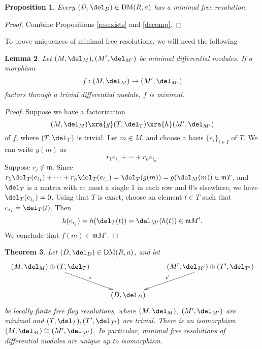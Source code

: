 \documentclass[12pt]{amsart}
\newtheorem{lemma}{Lemma}[section]
\newtheorem{prop}[lemma]{Proposition}
\newtheorem{thm}[lemma]{Theorem}
\theoremstyle{definition}
\theoremstyle{remark}
\newcommand{\m}{\mathfrak m}
\def\DM{\operatorname{DM}}
\begin{document}
\begin{prop}
Every $(D, \del_D) \in \DM(R, a)$ has a minimal free resolution.
\end{prop}

\begin{proof}
Combine Propositions \ref{resexists} and \ref{decomp}.
\end{proof}

To prove uniqueness of minimal free resolutions, we will need the following

\begin{lemma}
\label{factors}
Let $(M, \del_M), (M', \del_{M'})$ be minimal differential modules. If a morphism
$$
f : (M, \del_M) \to (M', \del_{M'})
$$
factors through a trivial differential module, $f$ is minimal.
\end{lemma}

\begin{proof}
Suppose we have a factorization
$$
(M, \del_M)  \xra{g} (T, \del_T) \xra{h} (M', \del_{M'})
$$
of $f$, where $(T, \del_T)$ is trivial. Let $m \in M$, and choose a basis $\{e_i\}_{i \in I}$ of $T$. We can write $g(m)$ as
$$
r_1 e_{i_1} + \cdots + r_n e_{i_n}.
$$
Suppose $r_j \notin \m$. Since $ r_1 \del_T(e_{i_1}) + \cdots + r_n \del_T(e_{i_n}) =  \del_T(g(m)) = g(\del_M(m))  \in \m T$, and $\del_T$ is a matrix with at most a single 1 in each row and 0's elsewhere, we have $\del_T(e_{i_j}) = 0$. Using that $T$ is exact, choose an element $t \in T$ such that $e_{i_j} = \del_T(t)$. Then
$$
h(e_{i_j}) = h(\del_T(t)) = \del_{M'}(h(t)) \in \m M'.
$$
We conclude that $f(m) \in \m M'$.
\end{proof}

\begin{thm}
\label{uniqueness}
Let $(D, \del_D) \in \DM(R, a)$, and let
$$
\xymatrix{
(M, \del_M) \oplus (T, \del_T) \ar[rd]^-{\epsilon}& &  (M', \del_{M'}) \oplus (T', \del_{T'}) \ar[ld]_-{\epsilon'}\\
&(D, \del_D)&
}
$$
be locally finite free flag resolutions, where $(M, \del_M)$, $(M', \del_{M'})$ are minimal and $(T, \del_T), (T', \del_{T'})$ are trivial. There is an isomorphism $(M, \del_M) \cong (M', \del_{M'})$. In particular, minimal free resolutions of differential modules are unique up to isomorphism.
\end{thm}
\end{document}
